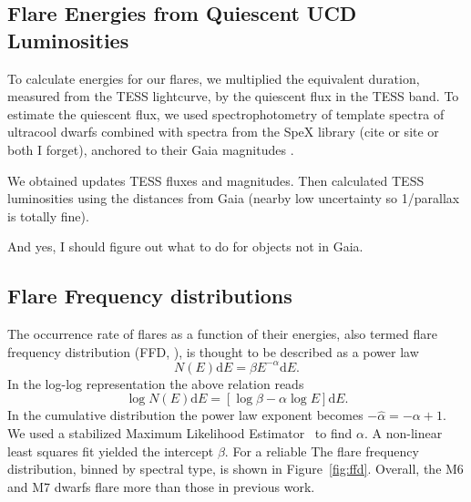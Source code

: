 \documentclass{aastex62}
\begin{document}

\subsection{Flare Energies from Quiescent UCD Luminosities} \label{subsec:tessmag}
To calculate energies for our flares, we multiplied the equivalent duration, measured from the TESS lightcurve, by the quiescent flux in the TESS band. To estimate the quiescent flux, we used spectrophotometry of template spectra of ultracool dwarfs \citep{Bochanski2007a,Schmidt2014a} combined with spectra from the SpeX library (cite or site or both I forget), anchored to their Gaia magnitudes \citep{Gaia-Collaboration2018}. 

We obtained updates TESS fluxes and magnitudes. Then calculated TESS luminosities using the distances from Gaia (nearby low uncertainty so 1/parallax is totally fine). 

And yes, I should figure out what to do for objects not in Gaia. 

\subsection{Flare Frequency distributions} \label{subsec:FFD}
The occurrence rate of flares as a function of their energies, also termed flare frequency distribution (FFD, \cite{lacy_uv_1976}), is thought to be described as a power law
\begin{equation}
N(E)\mathrm{d}E = \beta E^{-\alpha}\mathrm{d}E.
\end{equation}
In the log-log representation the above relation reads
\begin{equation}
\log N(E) \mathrm{d}E = [\log\beta -\alpha\log E] \mathrm{d}E.
\end{equation}
In the cumulative distribution the power law exponent becomes $-\hat{\alpha} = -\alpha +1$. 
 We used a stabilized Maximum Likelihood Estimator~\citep{maschberger2009} to find $\alpha$. A non-linear least squares fit yielded the intercept $\beta$. For a reliable
The flare frequency distribution, binned by spectral type, is shown in Figure~\ref{fig:ffd}. Overall, the M6 and M7 dwarfs flare more than those in previous work. 
\end{document}
